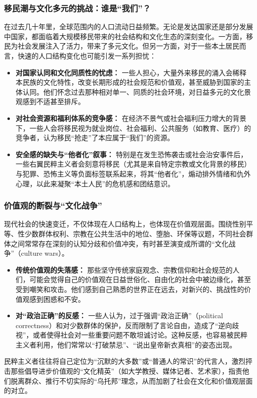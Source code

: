 \documentclass[UTF8, 10pt]{ctexbook}
\begin{document}
\subsubsection{移民潮与文化多元的挑战：谁是“我们”？}
在过去几十年里，全球范围内的人口流动日益频繁。无论是发达国家还是部分发展中国家，都面临着大规模移民带来的社会结构和文化生态的深刻变化。一方面，移民为社会发展注入了活力，带来了多元文化。但另一方面，对于一些本土居民而言，快速的人口结构变化也可能引发一系列担忧：
    \begin{itemize}
        \item \textbf{对国家认同和文化同质性的忧虑：} 一些人担心，大量外来移民的涌入会稀释本民族的文化特性，改变长期形成的社会规范和价值观，甚至威胁到国家的主体认同。他们怀念过去那种相对单一、同质的社会环境，对日益多元的文化景观感到不适甚至排斥。
        \item \textbf{对社会资源和福利体系的竞争感：} 在经济不景气或社会福利压力增大的背景下，一些人会将移民视为就业岗位、社会福利、公共服务（如教育、医疗）的竞争者，认为移民“抢走”了本应属于“我们”的资源。
        \item \textbf{安全感的缺失与“他者化”叙事：} 特别是在发生恐怖袭击或社会治安事件后，一些右翼民粹主义者会刻意将移民（尤其是来自特定宗教或文化背景的移民）与犯罪、恐怖主义等负面标签联系起来，将其“他者化”，煽动排外情绪和仇外心理，以此来凝聚“本土人民”的危机感和团结意识。
    \end{itemize}
\subsubsection{价值观的断裂与“文化战争”}
现代社会的快速变迁，不仅体现在人口结构上，也体现在价值观层面。围绕性别平等、性少数群体权利、宗教在公共生活中的地位、堕胎、环保等议题，不同社会群体之间常常存在深刻的认知分歧和价值冲突，有时甚至演变成所谓的“文化战争”（culture wars）。
    \begin{itemize}
        \item \textbf{传统价值观的失落感：} 那些坚守传统家庭观念、宗教信仰和社会规范的人们，可能会觉得自己的价值观在日益世俗化、自由化的社会中被边缘化，甚至受到嘲笑和攻击。他们感到自己熟悉的世界正在远去，对新兴的、挑战性的价值观感到困惑和不安。
        \item \textbf{对“政治正确”的反感：} 一些人认为，过于强调“政治正确”（political correctness）和对少数群体的保护，反而限制了言论自由，造成了“逆向歧视”，或者使得社会对一些重要问题不敢坦诚讨论。这种反感，也容易被民粹主义者利用，他们常常以“打破禁忌”、“说出皇帝新衣真相”的姿态出现。
    \end{itemize}
民粹主义者往往将自己定位为“沉默的大多数”或“普通人的常识”的代言人，激烈抨击那些倡导进步价值观的“文化精英”（如大学教授、媒体记者、艺术家），指责他们脱离群众、推行不切实际的“乌托邦”理念，从而加剧了社会在文化和价值观层面的对立。
\end{document}
